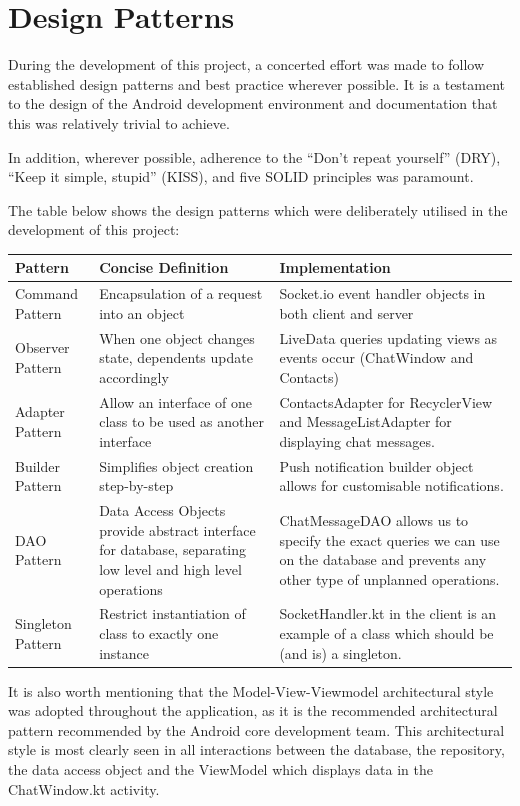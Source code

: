 \documentclass{mproj}
\begin{document}
\section{Design Patterns}
During the development of this project, a concerted effort was made to follow established design patterns and best practice wherever possible. It is a testament to the design of the Android development environment and documentation that this was relatively trivial to achieve. 

In addition, wherever possible, adherence to the ``Don't repeat yourself'' (DRY)\cite{10.5555/320326}, ``Keep it simple, stupid'' (KISS), and five SOLID principles\cite{martin2000design} was paramount.

The table below shows the design patterns which were deliberately utilised in the development of this project:
\begin{center}
\begin{tabular}{ |p{4cm}|p{4.5cm}|p{5.0cm}|}
	\hline
	Pattern & Concise Definition & Implementation\\
	\hline
	Command Pattern\cite{sarcar2020command} & Encapsulation of a request into an object  & Socket.io event handler objects in both client and server\\
	\hline
	Observer Pattern\cite{eales2005observer} & When one object changes state, dependents update accordingly & LiveData queries updating views as events occur (ChatWindow and Contacts)\\
	\hline
	Adapter Pattern\cite{harmes2008adapter} & Allow an interface of one class to be used as another interface & ContactsAdapter for RecyclerView and MessageListAdapter for displaying chat messages.\\
	\hline
	Builder Pattern\cite{sarcar2016builder} & Simplifies object creation step-by-step & Push notification builder object allows for customisable notifications.\\
	\hline
	DAO Pattern\cite{long2004data} & Data Access Objects provide abstract interface for database, separating low level and high level operations & ChatMessageDAO allows us to specify the exact queries we can use on the database and prevents any other type of unplanned operations.\\
	\hline
	Singleton Pattern\cite{stencel2008implementation} & Restrict instantiation of class to exactly one instance & SocketHandler.kt in the client is an example of a class which should be (and is) a singleton.\\
	\hline
\end{tabular}
\end{center}
It is also worth mentioning that the Model-View-Viewmodel architectural style was adopted throughout the application, as it is the recommended architectural pattern recommended by the Android core development team\cite{androiddevelopers}. 
This architectural style is most clearly seen in all interactions between the database, the repository, the data access object and the ViewModel which displays data in the ChatWindow.kt activity.
\end{document}
